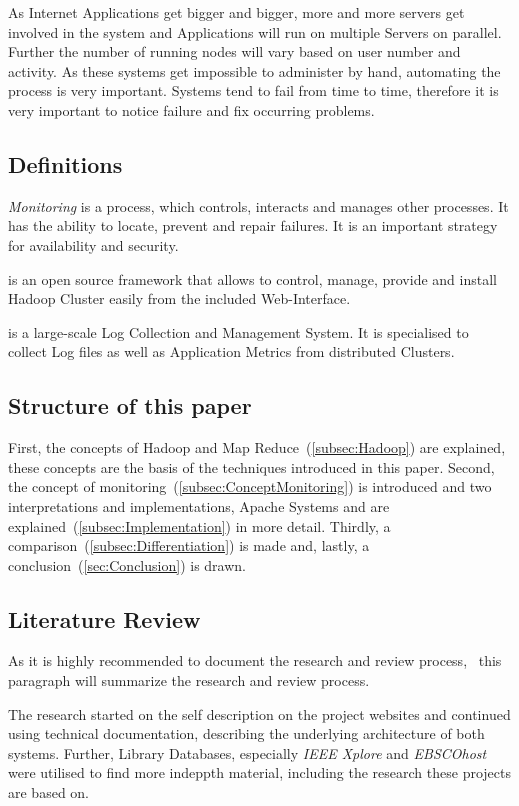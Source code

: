 As Internet Applications get bigger and bigger, more and more servers get involved in the system and Applications will run on multiple Servers on parallel. Further the number of running nodes will vary based on user number and activity. As these systems get impossible to administer by hand, automating the process is very important. Systems tend to fail from time to time, therefore it is very important to notice failure and fix occurring problems.


\subsection{Definitions}

\textit{Monitoring} is a process, which controls, interacts and manages other processes. It has the ability to locate, prevent and repair failures. It is an important strategy for availability and security.

\amb is an open source framework that allows to control, manage, provide and install Hadoop Cluster easily from the included Web-Interface.

\chuk is a large-scale Log Collection and Management System. It is specialised to collect Log files as well as Application Metrics from distributed Clusters.

\subsection{Structure of this paper}
First, the concepts of Hadoop and Map Reduce~(\ref{subsec:Hadoop}) are explained, these concepts are the basis of the techniques introduced in this paper. Second, the concept of monitoring~(\ref{subsec:ConceptMonitoring}) is introduced and two interpretations and implementations, Apache Systems \amb and \chuk are explained~(\ref{subsec:Implementation}) in more detail. Thirdly, a comparison~(\ref{subsec:Differentiation}) is made and, lastly, a conclusion~(\ref{sec:Conclusion}) is drawn.

\subsection{Literature Review}
	As it is highly recommended to document the research and review process,~\cite{brocke09} this paragraph will summarize the research and review process.
	
	The research started on the self description on the project websites and continued using technical documentation, describing the underlying architecture of both systems.
	Further, Library Databases, especially \emph{IEEE Xplore} and \emph{EBSCOhost} were utilised to find more indeppth material, including the research these projects are based on.
	
